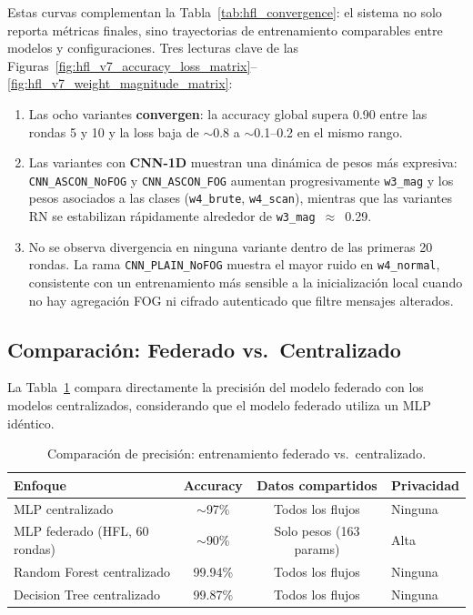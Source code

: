 Estas curvas complementan la Tabla~\ref{tab:hfl_convergence}: el sistema no solo reporta métricas finales, sino trayectorias de entrenamiento comparables entre modelos y configuraciones. Tres lecturas clave de las Figuras~\ref{fig:hfl_v7_accuracy_loss_matrix}--\ref{fig:hfl_v7_weight_magnitude_matrix}:
\begin{enumerate}[noitemsep, topsep=0pt]
    \item Las ocho variantes \textbf{convergen}: la accuracy global supera 0.90 entre las rondas 5 y 10 y la loss baja de $\sim$0.8 a $\sim$0.1--0.2 en el mismo rango.
    \item Las variantes con \textbf{CNN-1D} muestran una dinámica de pesos más expresiva: \texttt{CNN\_ASCON\_NoFOG} y \texttt{CNN\_ASCON\_FOG} aumentan progresivamente \texttt{w3\_mag} y los pesos asociados a las clases (\texttt{w4\_brute}, \texttt{w4\_scan}), mientras que las variantes RN se estabilizan rápidamente alrededor de \texttt{w3\_mag}~$\approx$~0.29.
    \item No se observa divergencia en ninguna variante dentro de las primeras 20 rondas. La rama \texttt{CNN\_PLAIN\_NoFOG} muestra el mayor ruido en \texttt{w4\_normal}, consistente con un entrenamiento más sensible a la inicialización local cuando no hay agregación FOG ni cifrado autenticado que filtre mensajes alterados.
\end{enumerate}

\subsection{Comparación: Federado vs.\ Centralizado}

La Tabla~\ref{tab:fed_vs_central} compara directamente la precisión del modelo federado con los modelos centralizados, considerando que el modelo federado utiliza un MLP idéntico.

\begin{table}[H]
\centering
\caption{Comparación de precisión: entrenamiento federado vs.\ centralizado.}
\label{tab:fed_vs_central}
\small
\begin{tabular}{l c c l}
\toprule
\textbf{Enfoque} & \textbf{Accuracy} & \textbf{Datos compartidos} & \textbf{Privacidad} \\
\midrule
MLP centralizado             & $\sim$97\%    & Todos los flujos      & Ninguna \\
MLP federado (HFL, 60 rondas) & $\sim$90\%   & Solo pesos (163 params) & Alta \\
Random Forest centralizado   & 99.94\%       & Todos los flujos      & Ninguna \\
Decision Tree centralizado   & 99.87\%       & Todos los flujos      & Ninguna \\
\bottomrule
\end{tabular}
\end{table}

